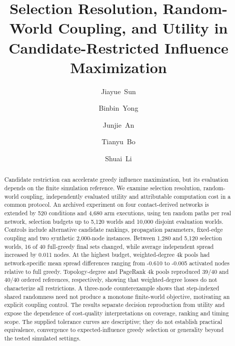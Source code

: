 \documentclass[smallextended]{svjour3}
\begin{document}
\title{Selection Resolution, Random-World Coupling, and Utility in Candidate-Restricted Influence Maximization}
\author{\mbox{Jiayue Sun} \and \mbox{Binbin Yong} \and \mbox{Junjie An} \and \mbox{Tianyu Bo} \and \mbox{Shuai Li}}
\date{}
\maketitle
\begin{abstract}
Candidate restriction can accelerate greedy influence maximization, but its evaluation depends on the finite simulation reference. We examine selection resolution, random-world coupling, independently evaluated utility and attributable computation cost in a common protocol. An archived experiment on four contact-derived networks is extended by 520 conditions and 4,680 arm executions, using ten random paths per real network, selection budgets up to 5,120 worlds and 10,000 disjoint evaluation worlds. Controls include alternative candidate rankings, propagation parameters, fixed-edge coupling and two synthetic 2,000-node instances. Between 1,280 and 5,120 selection worlds, 16 of 40 full-greedy final sets changed, while average independent spread increased by 0.011 nodes. At the highest budget, weighted-degree 4k pools had network-specific mean spread differences ranging from -0.610 to -0.005 activated nodes relative to full greedy. Topology-degree and PageRank 4k pools reproduced 39/40 and 40/40 ordered references, respectively, showing that weighted-degree losses do not characterize all restrictions. A three-node counterexample shows that step-indexed shared randomness need not produce a monotone finite-world objective, motivating an explicit coupling control. The results separate decision reproduction from utility and expose the dependence of cost-quality interpretations on coverage, ranking and timing scope. The supplied tolerance curves are descriptive; they do not establish practical equivalence, convergence to expected-influence greedy selection or generality beyond the tested simulated settings.
\end{abstract}
\end{document}
